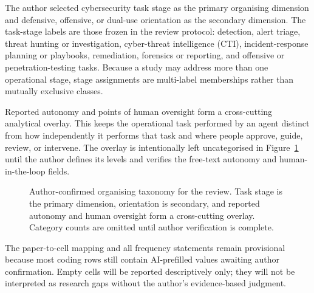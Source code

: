 The author selected cybersecurity task stage as the primary organising dimension and defensive, offensive, or dual-use orientation as the secondary dimension. The task-stage labels are those frozen in the review protocol: detection, alert triage, threat hunting or investigation, cyber-threat intelligence (CTI), incident-response planning or playbooks, remediation, forensics or reporting, and offensive or penetration-testing tasks. Because a study may address more than one operational stage, stage assignments are multi-label memberships rather than mutually exclusive classes.

Reported autonomy and points of human oversight form a cross-cutting analytical overlay. This keeps the operational task performed by an agent distinct from how independently it performs that task and where people approve, guide, review, or intervene. The overlay is intentionally left uncategorised in Figure~\ref{fig:taxonomy} until the author defines its levels and verifies the free-text autonomy and human-in-the-loop fields.

\begin{figure}[htbp]
  \centering
  
  \caption{Author-confirmed organising taxonomy for the review. Task stage is the primary dimension, orientation is secondary, and reported autonomy and human oversight form a cross-cutting overlay. Category counts are omitted until author verification is complete.}
  \label{fig:taxonomy}
\end{figure}

The paper-to-cell mapping and all frequency statements remain provisional because most coding rows still contain AI-prefilled values awaiting author confirmation. Empty cells will be reported descriptively only; they will not be interpreted as research gaps without the author's evidence-based judgment.
